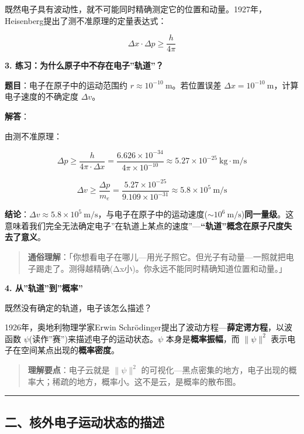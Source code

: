 \documentclass[a4paper,11pt]{ctexart}
\newcommand{\箭}{\ensuremath{\rightarrow}}
\newcommand{\左箭}{\ensuremath{\leftarrow}}
\newcommand{\上箭}{\ensuremath{\uparrow}}
\newcommand{\下箭}{\ensuremath{\downarrow}}
\newcommand{\衡}{\ensuremath{\rightleftharpoons}}
\newcommand{\双箭}{\ensuremath{\leftrightarrow}}
\newcommand{\约等于}{\ensuremath{\approx}}
\newcommand{\小于等于}{\ensuremath{\leq}}
\newcommand{\大于等于}{\ensuremath{\geq}}
\newcommand{\不等于}{\ensuremath{\neq}}
\newcommand{\西格马}{\ensuremath{\sigma}}
\newcommand{\派}{\ensuremath{\pi}}
\begin{document}
既然电子具有波动性，就不可能同时精确测定它的位置和动量。1927年，Heisenberg提出了测不准原理的定量表达式：

\[
\boxed{\Delta x \cdot \Delta p \geq \frac{h}{4\pi}}
\]

\textbf{3. 练习：为什么原子中不存在电子''轨道''？}

\textbf{题目}：电子在原子中的运动范围约 \(r \approx 10^{-10}\ \mathrm{m}\)。若位置误差 \(\Delta x = 10^{-10}\ \mathrm{m}\)，计算电子速度的不确定度 \(\Delta v\)。

\textbf{解答}：

由测不准原理：

\[\Delta p \geq \frac{h}{4\pi \cdot \Delta x} = \frac{6.626\times 10^{-34}}{4\pi \times 10^{-10}} \approx 5.27\times 10^{-25}\ \mathrm{kg\cdot m/s}\]

\[\Delta v \geq \frac{\Delta p}{m_e} = \frac{5.27\times 10^{-25}}{9.109\times 10^{-31}} \approx 5.8\times 10^5\ \mathrm{m/s}\]

\textbf{结论}：\(\Delta v \approx 5.8\times 10^5\ \mathrm{m/s}\)，与电子在原子中的运动速度(\(\sim 10^6\ \mathrm{m/s}\))\textbf{同一量级}。这意味着我们完全无法确定电子''在轨道上某点的速度''---\textbf{``轨道''概念在原子尺度失去了意义}。

\begin{quote}
\textbf{通俗理解}：「你想看电子在哪儿---用光子照它。但光子有动量---一照就把电子踢走了。测得越精确(Δx小)。你永远不能同时精确知道位置和动量。」
\end{quote}

\textbf{4. 从''轨道''到''概率''}

既然没有确定的轨道，电子该怎么描述？

1926年，奥地利物理学家Erwin Schrödinger提出了波动方程---\textbf{薛定谔方程}，以波函数 \(\psi\)(读作''赛'')来描述电子的运动状态。\(\psi\) 本身是\textbf{概率振幅}，而 \(\|\psi\|^2\) 表示电子在空间某点出现的\textbf{概率密度}。

\begin{quote}
\textbf{理解要点}：电子云就是 \(\|\psi\|^2\) 的可视化---黑点密集的地方，电子出现的概率大；稀疏的地方，概率小。这不是云，是概率的散布图。
\end{quote}

\begin{center}\rule{0.5\linewidth}{0.5pt}\end{center}

\subsection{二、核外电子运动状态的描述}\label{ux4e8cux6838ux5916ux7535ux5b50ux8fd0ux52a8ux72b6ux6001ux7684ux63cfux8ff0}
\end{document}
